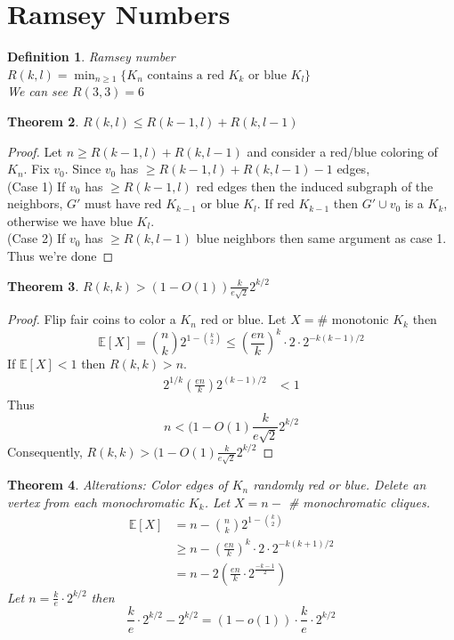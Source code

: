 \documentclass[a4paper]{article}
\newtheorem{thm}{Theorem}[section]
\newtheorem{defn}[thm]{Definition}
\begin{document}
\section{Ramsey Numbers}
\begin{defn}
    Ramsey number $R(k,l)=\min_{n\geq 1}\{K_n \text{ contains a red $K_k$ or blue $K_l$}\}$\\
    We can see $R(3,3)=6$
\end{defn}
\begin{thm}
    $R(k,l)\leq R(k-1,l)+R(k,l-1)$
\end{thm}
\begin{proof}
    Let $n\geq R(k-1,l)+R(k,l-1)$ and consider a red/blue coloring of $K_n.$ Fix $v_0$. Since $v_0$ has $\geq R(k-1,l)+R(k,l-1)-1$ edges,\\
    (Case 1) If $v_0$ has $\geq R(k-1,l)$ red edges then the induced subgraph of the neighbors, $G'$ must have red $K_{k-1}$ or blue $K_{l}.$ If red $K_{k-1}$ then $G'\cup v_0$ is a $K_k$, otherwise we have blue $K_{l}.$ \\
    (Case 2) If $v_0$ has $\geq R(k,l-1)$ blue neighbors then same argument as case 1.\\
    Thus we're done
\end{proof}
\begin{thm}
    $R(k,k)>(1-O(1))\frac{k}{e\sqrt{2}}2^{k/2}$
\end{thm}
\begin{proof}
    Flip fair coins to color a $K_n$ red or blue. Let $X=\#$ monotonic $K_k$ then $$\mathbb{E}[X]={n \choose k}2^{1-{k \choose 2}}\leq \left (\frac{en}{k} \right )^k\cdot 2\cdot 2^{-k(k-1)/2}$$
    If $\mathbb{E}[X]<1$ then $R(k,k)>n$.
    \begin{align*}
        2^{1/k}\left (\frac{en}{k}\right )2^{(k-1)/2}&<1
    \end{align*}
    Thus $$n<(1-O(1)\frac{k}{e\sqrt{2}}2^{k/2}$$
    Consequently, $R(k,k)>(1-O(1)\frac{k}{e\sqrt{2}}2^{k/2}$
\end{proof}
\begin{thm}
    Alterations: Color edges of $K_n$ randomly red or blue. Delete an vertex from each monochromatic $K_k$. Let $X=n-$ \# monochromatic cliques.\\
    \begin{align*}
        \mathbb{E}[X]&=n-{n \choose k}2^{1-{k \choose 2}}\\
        &\geq n-\left (\frac{en}{k} \right )^k\cdot 2\cdot 2^{-k(k+1)/2}\\
        &=n-2\left (\frac{en}{k}\cdot 2^{\frac{-k-1}{2}} \right )
    \end{align*}
    Let $n=\frac{k}{e}\cdot 2^{k/2}$ then $$\frac{k}{e}\cdot 2^{k/2}-2^{k/2}=(1-o(1))\cdot\frac{k}{e}\cdot 2^{k/2}$$
\end{thm}
\end{document}
